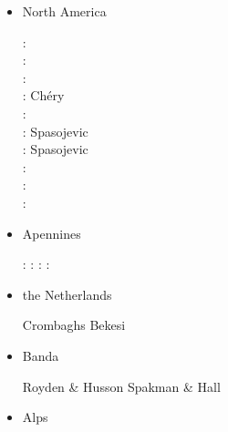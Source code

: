 \begin{itemize}
\item North America 

\begin{scriptsize}
\nineteenseventythree: \cite{sabu73}\\
\nineteenninety: \cite{huha90}\\
\nineteenninetyseven: \cite{bugm97}\\
\twothousandone: Ch\'ery \etal \cite{chzh01} \\
\twothousandsix: \cite{besb06}\\
\twothousandeight: Spasojevic \etal \cite{splg08}\\
\twothousandnine: Spasojevic \etal \cite{splg09}\\
\twothousandtwelve: \cite{beck12}\\
\twothousandthirteen: \cite{ghbh13}\cite{simi13}\\
\twothousandfifteen: \cite{riag15}
\end{scriptsize}

\item Apennines 

\begin{scriptsize}
\nineteenninetyeight: \cite{buwg98}
\twothousandseven: \cite{shpy07}
\twothousandnine: \cite{rohu09}
\twothousandfifteen: \cite{vami15}
\end{scriptsize}

\item the Netherlands 

\begin{scriptsize}
\twothousandtwo Crombaghs \etal \cite{crdv02}
\twothousandtwenty Bekesi \etal \cite{besb20}
\end{scriptsize}



\item Banda 

\begin{scriptsize}
Royden \& Husson \cite{rohu09}
Spakman \& Hall \cite{spha10}
\end{scriptsize}


\item Alps 


\end{itemize}
